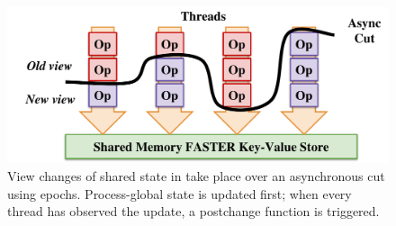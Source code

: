\begin{figure}[t]
\centering
\includegraphics[width=\columnwidth]{figures/global-cut.pdf}
\caption{View changes of shared state in \faster take place over
    an asynchronous cut using epochs. Process-global state is updated first; when
    every thread has observed the update, a postchange function is triggered.}
\label{fig:cut}
\end{figure}
